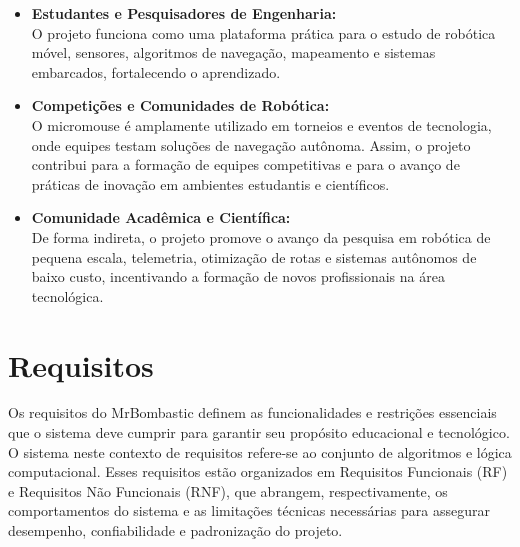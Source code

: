 \begin{itemize}
    \item \textbf{Estudantes e Pesquisadores de Engenharia:} \\
    O projeto funciona como uma plataforma prática para o estudo de robótica móvel, sensores, algoritmos de navegação, mapeamento e sistemas embarcados, fortalecendo o aprendizado.

    \item \textbf{Competições e Comunidades de Robótica:} \\
    O micromouse é amplamente utilizado em torneios e eventos de tecnologia, onde equipes testam soluções de navegação autônoma. Assim, o projeto contribui para a formação de equipes competitivas e para o avanço de práticas de inovação em ambientes estudantis e científicos.

    \item \textbf{Comunidade Acadêmica e Científica:} \\
    De forma indireta, o projeto promove o avanço da pesquisa em robótica de pequena escala, telemetria, otimização de rotas e sistemas autônomos de baixo custo, incentivando a formação de novos profissionais na área tecnológica.

\end{itemize}

\section{Requisitos}

Os requisitos do MrBombastic definem as funcionalidades e restrições essenciais que o sistema deve cumprir para garantir seu propósito educacional e tecnológico. O sistema neste contexto de requisitos refere-se ao conjunto de algoritmos e lógica computacional. Esses requisitos estão organizados em Requisitos Funcionais (RF) e Requisitos Não Funcionais (RNF), que abrangem, respectivamente, os comportamentos do sistema e as limitações técnicas necessárias para assegurar desempenho, confiabilidade e padronização do projeto.


